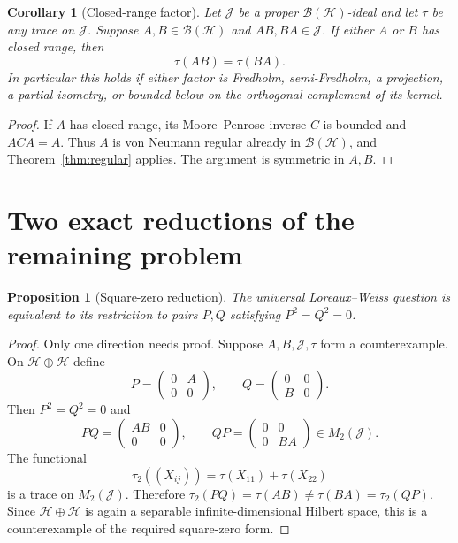 \documentclass[11pt]{article}
\newtheorem{corollary}[theorem]{Corollary}
\newtheorem{proposition}[theorem]{Proposition}
\theoremstyle{remark}
\newcommand{\BH}{\mathcal B(\mathcal H)}
\newcommand{\JJ}{\mathcal J}
\newcommand{\trc}{\tau}
\begin{document}
\begin{corollary}[Closed-range factor]\label{cor:closed-range}
Let $\JJ$ be a proper $\BH$-ideal and let $\trc$ be any trace on $\JJ$.
Suppose $A,B\in\BH$ and $AB,BA\in\JJ$.  If either $A$ or $B$ has closed
range, then
\[
 \trc(AB)=\trc(BA).
\]
In particular this holds if either factor is Fredholm, semi-Fredholm, a
projection, a partial isometry, or bounded below on the orthogonal complement
of its kernel.
\end{corollary}

\begin{proof}
If $A$ has closed range, its Moore--Penrose inverse $C$ is bounded and
$ACA=A$.  Thus $A$ is von Neumann regular already in $\BH$, and
Theorem~\ref{thm:regular} applies.  The argument is symmetric in $A,B$.
\end{proof}

\section{Two exact reductions of the remaining problem}

\begin{proposition}[Square-zero reduction]\label{prop:squarezero}
The universal Loreaux--Weiss question is equivalent to its restriction to
pairs $P,Q$ satisfying $P^2=Q^2=0$.
\end{proposition}

\begin{proof}
Only one direction needs proof.  Suppose $A,B,\JJ,\trc$ form a counterexample.
On $\mathcal H\oplus\mathcal H$ define
\[
 P=\begin{pmatrix}0&A\\0&0\end{pmatrix},
 \qquad
 Q=\begin{pmatrix}0&0\\B&0\end{pmatrix}.
\]
Then $P^2=Q^2=0$ and
\[
 PQ=\begin{pmatrix}AB&0\\0&0\end{pmatrix},
 \qquad
 QP=\begin{pmatrix}0&0\\0&BA\end{pmatrix}
 \in M_2(\JJ).
\]
The functional
\[
 \trc_2((X_{ij}))=\trc(X_{11})+\trc(X_{22})
\]
is a trace on $M_2(\JJ)$.  Therefore
$\trc_2(PQ)=\trc(AB)\neq\trc(BA)=\trc_2(QP)$.  Since
$\mathcal H\oplus\mathcal H$ is again a separable infinite-dimensional
Hilbert space, this is a counterexample of the required square-zero form.
\end{proof}
\end{document}
